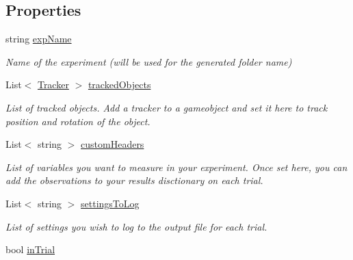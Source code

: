 \subsection*{Properties}
\begin{DoxyCompactItemize}
\item 
string \hyperlink{class_exp_mngr_1_1_experiment_session_a2f36fe150c21693bb8a6187ead3d10ee}{exp\+Name}
\begin{DoxyCompactList}\small\item\em Name of the experiment (will be used for the generated folder name) \end{DoxyCompactList}\item 
List$<$ \hyperlink{class_exp_mngr_1_1_tracker}{Tracker} $>$ \hyperlink{class_exp_mngr_1_1_experiment_session_ac0b97ef71855eddccf6a65d936155458}{tracked\+Objects}
\begin{DoxyCompactList}\small\item\em List of tracked objects. Add a tracker to a gameobject and set it here to track position and rotation of the object. \end{DoxyCompactList}\item 
List$<$ string $>$ \hyperlink{class_exp_mngr_1_1_experiment_session_a2c32317e1c4e5c9da8afd6468a1324ba}{custom\+Headers}
\begin{DoxyCompactList}\small\item\em List of variables you want to measure in your experiment. Once set here, you can add the observations to your results disctionary on each trial. \end{DoxyCompactList}\item 
List$<$ string $>$ \hyperlink{class_exp_mngr_1_1_experiment_session_a04825a734a71cd74aae3329e078bbd54}{settings\+To\+Log}
\begin{DoxyCompactList}\small\item\em List of settings you wish to log to the output file for each trial. \end{DoxyCompactList}\item 
bool \hyperlink{class_exp_mngr_1_1_experiment_session_af6a500293c7f72e8f968d1ad200fcca4}{in\+Trial}

\end{DoxyCompactItemize}
